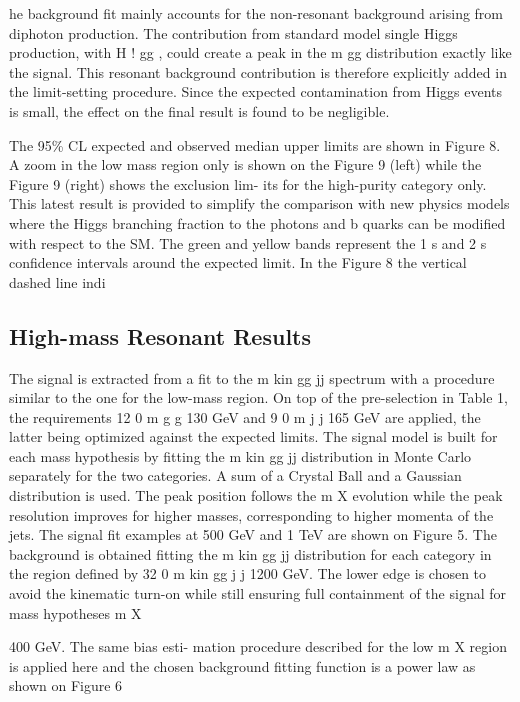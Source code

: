 he background fit mainly accounts for the non-resonant background arising from diphoton
production.  The contribution from standard model single Higgs production, with
H
!
gg
,
could create a peak in the
m
gg
distribution exactly like the signal.  This resonant background
contribution is therefore explicitly added in the limit-setting procedure.   Since the expected
contamination from Higgs events is small, the effect on the final result is found to be negligible.

The  95\% CL
expected and observed median upper limits are shown in Figure 8.  A zoom in the low mass
region only is shown on the Figure 9 (left) while the Figure 9 (right) shows the exclusion lim-
its for the high-purity category only.  This latest result is provided to simplify the comparison
with new physics models where the Higgs branching fraction to the photons and b quarks
can be modified with respect to the SM. The green and yellow bands represent the 1
s
and 2
s
confidence intervals around the expected limit.  In the Figure 8 the vertical dashed line indi


\subsection{High-mass Resonant Results}

The signal is  extracted from a fit  to the
m
kin
gg
jj
spectrum with a  procedure similar to the  one
for  the  low-mass  region.   On  top  of  the  pre-selection  in  Table  1,  the  requirements  12
0
m
g
g
130 GeV and 9
0
m
j
j
165 GeV are applied, the latter being optimized against
the expected limits.
The signal model is built for each mass hypothesis by fitting the
m
kin
gg
jj
distribution in Monte
Carlo separately for the two categories.  A sum of a Crystal Ball and a Gaussian distribution
is used.  The peak position follows the
m
X
evolution while the peak resolution improves for
higher masses,  corresponding to higher momenta of the jets.  The signal fit examples at 500
GeV and 1 TeV are shown on Figure 5.
The background is obtained fitting the
m
kin
gg
jj
distribution for each category in the region defined
by 32
0
m
kin
gg
j
j
1200 GeV. The lower edge is chosen to avoid the kinematic turn-on while still
ensuring full containment of the signal for mass hypotheses
m
X




400 GeV. The same bias esti-
mation procedure described for the low
m
X
region is applied here and the chosen background
fitting function is a power law as shown on Figure 6


